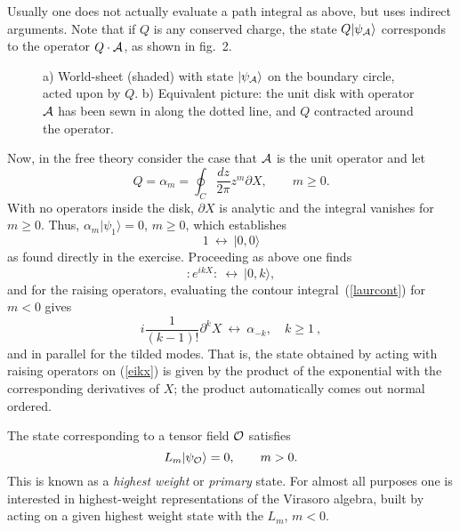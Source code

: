 Usually one does not actually evaluate a path integral as above,
but uses indirect arguments.  Note that if $Q$ is any conserved
charge, the state $Q | \psi_{\cal A} \rangle$ corresponds to
the operator $Q \cdot {\cal A}$, as shown in fig.~2.
\begin{figure}
\begin{center}
\leavevmode
{}
\end{center}
\caption[]{a) World-sheet (shaded) with
state $| \psi_{\cal A} \rangle$ on the boundary circle, acted upon by
$Q$.  b) Equivalent picture: the unit disk with operator ${\cal A}$
has been sewn in along the dotted line, and $Q$ contracted around the
operator.}
\end{figure}
Now, in
the free theory consider the case that ${\cal A}$ is the unit
operator and let
\begin{equation}
Q = \alpha_m = \oint_C \frac{dz}{2\pi} z^m \partial X,\qquad m
\geq 0.  \label{laurcont}
\end{equation}
With no operators inside the disk, $\partial X$ is analytic and the
integral vanishes for $m \geq 0$.  Thus, $\alpha_m
|\psi_1 \rangle = 0$, $m\geq 0$, which establishes
\begin{equation}
1 \ \leftrightarrow\ |0,0\rangle
\end{equation}
as found directly in the exercise.  Proceeding as above one finds
\begin{equation}
:\! e^{i k X} \! : \ \leftrightarrow\ |0,k\rangle,
\label{eikx}
\end{equation}
and for the raising operators, evaluating the contour
integral~(\ref{laurcont}) for $m < 0$ gives
\begin{equation}
i \frac{1}{(k-1)!} \partial^k X 
\ \leftrightarrow\ \alpha_{-k} ,\quad k\geq 1 \ , \label{stoo}
\end{equation}
and in parallel for the tilded modes.
That is, the state obtained by acting with raising operators on
(\ref{eikx}) is given by the product of the exponential with the
corresponding derivatives of $X$; the product automatically comes
out normal ordered.

The state corresponding to a tensor field ${\cal O}$ satisfies
\begin{equation}
L_m | \psi_{\cal O} \rangle = 0, \qquad m > 0.
\end{equation}
This is known as a {\it highest weight} or {\it primary} state.
For almost all purposes one is interested in highest-weight
representations of the Virasoro algebra, built by acting on a given
highest weight state with the $L_m$, $m < 0$.

